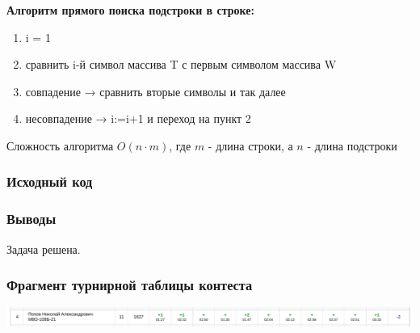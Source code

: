 \newline

\textbf{Алгоритм прямого поиска подстроки в строке:} 
\begin{enumerate}
    \item i = 1
    \item сравнить i-й символ массива T с первым символом массива W
    \item совпадение → сравнить вторые символы и так далее
    \item несовпадение → i:=i+1 и переход на пункт 2
\end{enumerate}

Сложность алгоритма $O(n \cdot m)$, где $m$ - длина строки, а $n$ - длина подстроки

\subsubsection*{Исходный код}



\subsubsection*{Выводы}
Задача решена.

\subsubsection*{Фрагмент турнирной таблицы контеста}
\begin{center}
\includegraphics[width=\textwidth]{standings/Contest1Result.png}\newline\noindent
\end{center}


